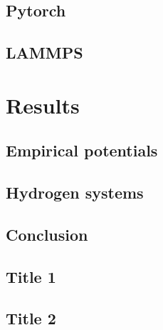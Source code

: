 \documentclass[12pt]{report}
\begin{document}
\chapter{Pytorch}

\chapter{LAMMPS}

\part{Results}

\chapter{Empirical potentials}

\chapter{Hydrogen systems}
 
\chapter{Conclusion}


\begin{appendices}

\chapter{Title 1}

\chapter{Title 2}

\end{appendices}

\printbibliography
\end{document}
